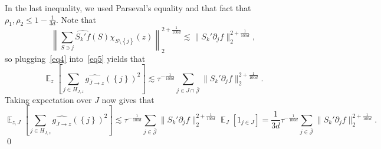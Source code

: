 \documentclass[10pt]{article}
\newcommand{\set}[1]{{\left\{#1\right\}}}
\newcommand{\Expect}[2]{{\mathop{\mathbb E}_{#1}\left[#2\right]}}
\newcommand{\norm}[1]{\lVert #1\rVert}
\renewcommand{\ll}{\lesssim}
\begin{document}
  In the last inequality, we used Parseval's equality and that fact that $\rho_1,\rho_2\leq 1-\frac{1}{3d}$.
%
%
%
%
%
%
%
%
%
%
  Note that
  \[
  \left\|\sum\limits_{S\ni j}\widehat{S_k' f}(S)\chi_{S\setminus\set{j}}(z)\right\|_2^{2+\frac{1}{100d}}
  \ll \norm{S_k' \partial_j f}_2^{2+\frac{1}{100d}},
  \]
  so plugging~\eqref{eq4} into~\eqref{eq5} yields that
  \[
  \Expect{z}{\sum\limits_{j\in H_{J,z}}\widehat{g_{\overline{J}\rightarrow z}}(\set{j})^2}\ll
  \tau^{-\frac{1}{100d}}\sum\limits_{j\in J\cap\bar{\mathcal{J}}}\norm{S_k' \partial_j f}_2^{2+\frac{1}{100d}}.
  \]
  Taking expectation over $J$ now gives that
  \[
  \Expect{z,J}{\sum\limits_{j\in H_{J,z}}\widehat{g_{\overline{J}\rightarrow z}}(\set{j})^2}
  \ll
  \tau^{-\frac{1}{100d}}\sum\limits_{j\in\bar{\mathcal{J}}} \norm{S_k' \partial_j f}_2^{2+\frac{1}{100d}} \Expect{J}{1_{j\in J}}
  = \frac{1}{3d}\tau^{-\frac{1}{100d}}\sum\limits_{j\in\bar{\mathcal{J}}} \norm{S_k' \partial_j f}_2^{2+\frac{1}{100d}}.
  \]
\qed
\end{document}
